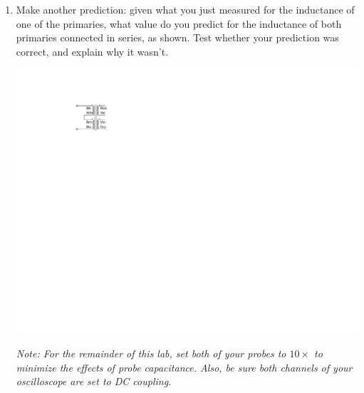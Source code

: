 \begin{enumerate}[wide]
\item Make another prediction: given what you just measured for the inductance of one of the primaries, what value do you predict for the inductance of both primaries connected in series, as shown.  Test whether your prediction was correct, and explain why it wasn't. 
\begin{center}
\includegraphics{inductors/transformer_as_inductor2.pdf}
\end{center}
 
\medskip 

\textit{Note: For the remainder of this lab, set both of your probes to $10\times$ to minimize the effects of probe capacitance. Also, be sure both channels of your oscilloscope are set to DC coupling.}


\end{enumerate}
